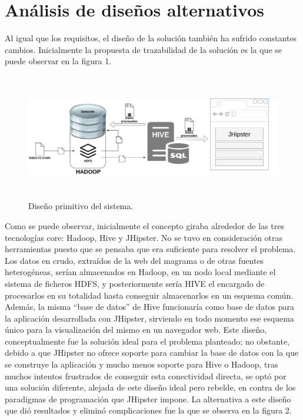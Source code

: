 \begin{enumerate}
\endgroup

\end{enumerate}

\section{Análisis de diseños alternativos}

Al igual que los requisitos, el diseño de la solución también ha sufrido constantes cambios. Inicialmente la propuesta de trazabilidad de la solución es la que se puede observar en la figura 1. \par

\begin{figure}[H]
    \centering
    \includegraphics[width=1\textwidth,height=5.5cm]{Imagenes/Dis_Fig_1}
    \caption{Diseño primitivo del sistema.}
    \label{fig:dis_1_sist}
\end{figure}
\par


Como se puede observar, inicialmente el concepto giraba alrededor de las tres tecnologías core: Hadoop, Hive y JHipster. No se tuvo en consideración otras herramientas puesto que se pensaba que era suficiente para resolver el problema. Los datos en crudo, extraídos de la web del magrama o de otras fuentes heterogéneas, serían almacenados en Hadoop, en un nodo local mediante el sistema de ficheros HDFS, y posteriormente sería HIVE el encargado de procesarlos en su totalidad hasta conseguir almacenarlos en un esquema común. Además, la misma “base de datos” de Hive funcionaría como base de datos para la aplicación desarrollada con JHipster, sirviendo en todo momento ese esquema único para la visualización del mismo en un navegador web. Este diseño, conceptualmente fue la solución ideal para el problema planteado; no obstante, debido a que JHipster no ofrece soporte para cambiar la base de datos con la que se construye la aplicación y mucho menos soporte para Hive o Hadoop, tras muchos intentos frustrados de conseguir esta conectividad directa, se optó por una solución diferente, alejada de este diseño ideal pero rebelde, en contra de los paradigmas de programación que JHipster impone. La alternativa a este diseño que dió resultados y eliminó complicaciones fue la que se observa en la figura 2. \par


